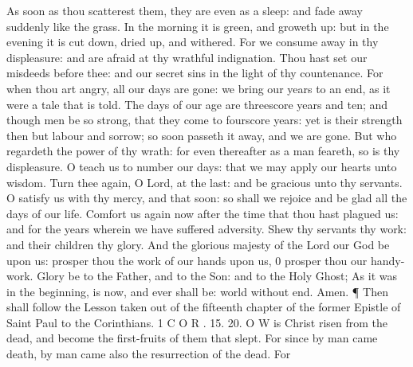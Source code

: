 As soon as thou scatterest them, they are even as a sleep: and fade away suddenly like the grass. In the morning it is green, and groweth up: but in the evening it is cut down, dried up, and withered. For we consume away in thy displeasure: and are afraid at thy wrathful indignation. Thou hast set our misdeeds before thee: and our secret sins in the light of thy countenance. For when thou art angry, all our days are gone: we bring our years to an end, as it were a tale that is told. The days of our age are threescore years and ten; and though men be so strong, that they come to fourscore years: yet is their strength then but labour and sorrow; so soon passeth it away, and we are gone. But who regardeth the power of thy wrath: for even thereafter as a man feareth, so is thy displeasure. O teach us to number our days: that we may apply our hearts unto wisdom. Turn thee again, O Lord, at the last: and be gracious unto thy servants. O satisfy us with thy mercy, and that soon: so shall we rejoice and be glad all the days of our life. Comfort us again now after the time that thou hast plagued us: and for the years wherein we have suffered adversity. Shew thy servants thy work: and their children thy glory. And the glorious majesty of the Lord our God be upon us: prosper thou the work of our hands upon us, 0 prosper thou our handy-work. Glory be to the Father, and to the Son: and to the Holy Ghost; As it was in the beginning, is now, and ever shall be: world without end. Amen. ¶ Then shall follow the Lesson taken out of the fifteenth chapter of the former Epistle of Saint Paul to the Corinthians. 1 C O R . 15. 20. O W is Christ risen from the dead, and become the first-fruits of them that slept. For since by man came death, by man came also the resurrection of the dead. For

